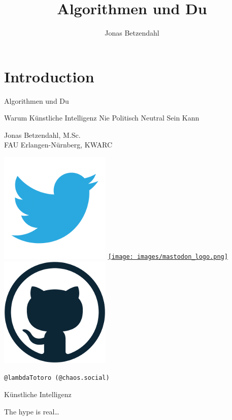 \documentclass[aspectratio=169,x11names]{beamer}
\author{Jonas Betzendahl}
\title{Algorithmen und Du}
\begin{document}
\section{Introduction}

\begin{frame}
\begin{center}
\vfill
\huge Algorithmen und Du
\normalsize 
\smallskip
\smallskip

Warum Künstliche Intelligenz Nie Politisch Neutral Sein Kann
\bigskip\bigskip

\large Jonas Betzendahl, M.Sc.\\\normalsize FAU Erlangen-Nürnberg, KWARC
\bigskip\bigskip\large

\href{https://twitter.com/lambdatotoro}{\includegraphics[scale=0.125]{images/twitter_logo.png}}
\href{https://chaos.social/@lambdatotoro}{\texttt{[image: images/mastodon\_logo.png]}}
\href{https://github.com/lambdaTotoro}{\includegraphics[scale=0.125]{images/github_logo.png}}

\texttt{@lambdaTotoro (@chaos.social)}
\end{center}
\end{frame}



\begin{frame}
\begin{center}
\Huge
Künstliche Intelligenz
\bigskip

\LARGE
The hype is real\dots
\end{center}
\end{frame}
\end{document}
